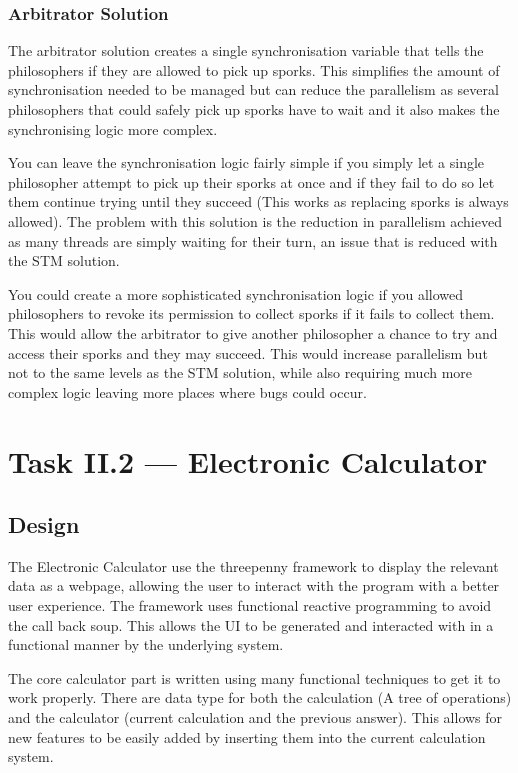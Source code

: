 \documentclass[a4paper]{article}
\begin{document}
\subsubsection{Arbitrator Solution}
The arbitrator solution creates a single synchronisation variable that tells the philosophers if they are allowed to pick up sporks.
This simplifies the amount of synchronisation needed to be managed but can reduce the parallelism as several philosophers that could safely pick up sporks have to wait and it also makes the synchronising logic more complex.
\par
You can leave the synchronisation logic fairly simple if you simply let a single philosopher attempt to pick up their sporks at once and if they fail to do so let them continue trying until they succeed (This works as replacing sporks is always allowed).
The problem with this solution is the reduction in parallelism achieved as many threads are simply waiting for their turn, an issue that is reduced with the STM solution.
\par
You could create a more sophisticated synchronisation logic if you allowed philosophers to revoke its permission to collect sporks if it fails to collect them.
This would allow the arbitrator to give another philosopher a chance to try and access their sporks and they may succeed.
This would increase parallelism but not to the same levels as the STM solution, while also requiring much more complex logic leaving more places where bugs could occur.

\section{Task II.2 --- Electronic Calculator}

\subsection{Design}
The Electronic Calculator use the threepenny framework to display the relevant data as a webpage, allowing the user to interact with the program with a better user experience.
The framework uses functional reactive programming to avoid the call back soup.
This allows the UI to be generated and interacted with in a functional manner by the underlying system.
\par
The core calculator part is written using many functional techniques to get it to work properly.
There are data type for both the calculation (A tree of operations) and the calculator (current calculation and the previous answer).
This allows for new features to be easily added by inserting them into the current calculation system.
\end{document}
